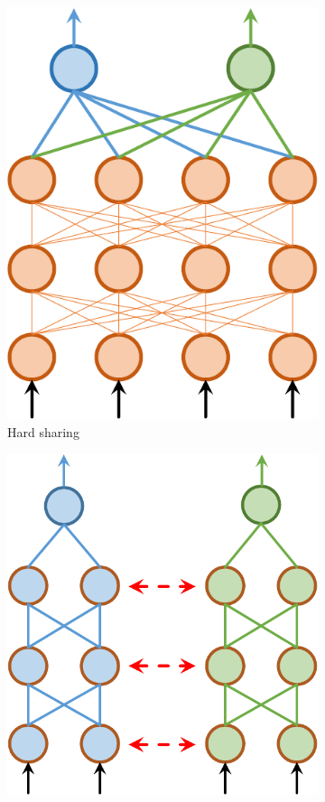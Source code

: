 \documentclass[letterpaper]{article} %
\begin{document}
\begin{figure}[htb]
	\centering
	\begin{subfigure}{0.45\linewidth}
        \centering
        \includegraphics[scale=.36]{3353_hard_sharing.pdf}
        \caption{Hard sharing}
        \label{sfig:hard-sharing}
        \end{subfigure}\hfill
    \begin{subfigure}{0.45\linewidth}
        \centering
        \includegraphics[scale=.36]{3353_soft_sharing.pdf}

\end{subfigure}
\end{figure}
\end{document}
